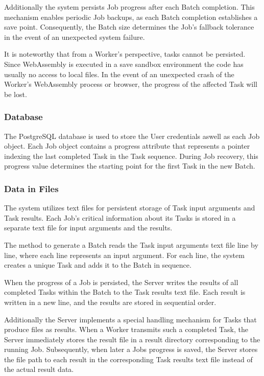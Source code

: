 Additionally the system persists Job progress after each Batch completion. This mechanism enables periodic Job backups, as each Batch completion establishes a save point. Consequently, the Batch size determines the Job's fallback tolerance in the event of an unexpected system failure.

It is noteworthy that from a Worker's perspective, tasks cannot be persisted. Since WebAssembly is executed in a save sandbox environment the code has usually no access to local files. In the event of an unexpected crash of the Worker's WebAssembly process or browser, the progress of the affected Task will be lost.

\subsubsection{Database}
The PostgreSQL database is used to store the User credentials aswell as each Job object. Each Job object contains a progress attribute that represents a pointer indexing the last completed Task in the Task sequence. During Job recovery, this progress value determines the starting point for the first Task in the new Batch.

\subsubsection{Data in Files}
The system utilizes text files for persistent storage of Task input arguments and Task results. Each Job's critical information about its Tasks is stored in a separate text file for input arguments and the results. 

The method to generate a Batch reads the Task input arguments text file line by line, where each line represents an input argument. For each line, the system creates a unique Task and adds it to the Batch in sequence.

When the progress of a Job is persisted, the Server writes the results of all completed Tasks within the Batch to the Task results text file. Each result is written in a new line, and the results are stored in sequential order.

Additionally the Server implements a special handling mechanism for Tasks that produce files as results. When a Worker transmits such a completed Task, the Server immediately stores the result file in a result directory corresponding to the running Job. Subsequently, when later a Jobs progress is saved, the Server stores the file path to each result in the corresponding Task results text file instead of the actual result data.

